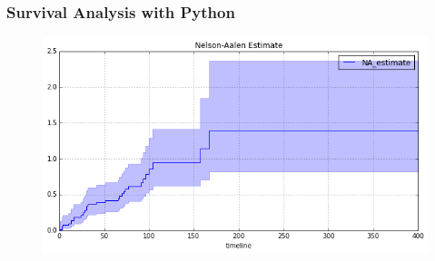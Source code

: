 \documentclass[MasterNotes.tex]{subfiles}
\begin{document}
	
\begin{frame}
	\frametitle{Survival Analysis with Python}
	\large
\begin{figure}
\centering
\includegraphics[width=0.99\linewidth]{images/lifelines-plotly-NAFplot}
\caption{}
\label{fig:lifelines-plotly-NAFplot}
\end{figure}
\end{frame}
\end{document}
